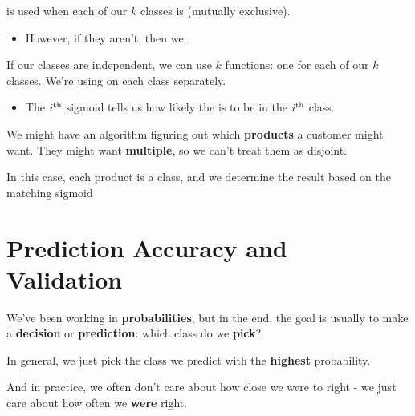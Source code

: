             \begin{clarification}
                 is used when each of our $k$ classes is  (mutually exclusive).

                \begin{itemize}
                    \item However, if they aren't, then we .   
                \end{itemize}

                \subsecdiv

                If our classes are independent, we can use $k$  functions: one for each of our $k$ classes. We're using  on each class separately.

                \begin{itemize}
                    \item The $i^{ \text{th} }$ sigmoid tells us how likely the  is to be in the $i^{ \text{th} }$ class.
                \end{itemize}
                
            \end{clarification}

            \miniex We might have an algorithm figuring out which \textbf{products} a customer might want. They might want \textbf{multiple}, so we can't treat them as disjoint.

            In this case, each product is a class, and we determine the result based on the matching sigmoid

\pagebreak

\section{Prediction Accuracy and Validation}

    We've been working in \textbf{probabilities}, but in the end, the goal is usually to make a \textbf{decision} or \textbf{prediction}: which class do we \textbf{pick}?
    
    In general, we just pick the class we predict with the \textbf{highest} probability.
    
    And in practice, we often don't care about how close we were to right - we just care about how often we \textbf{were} right.
    
